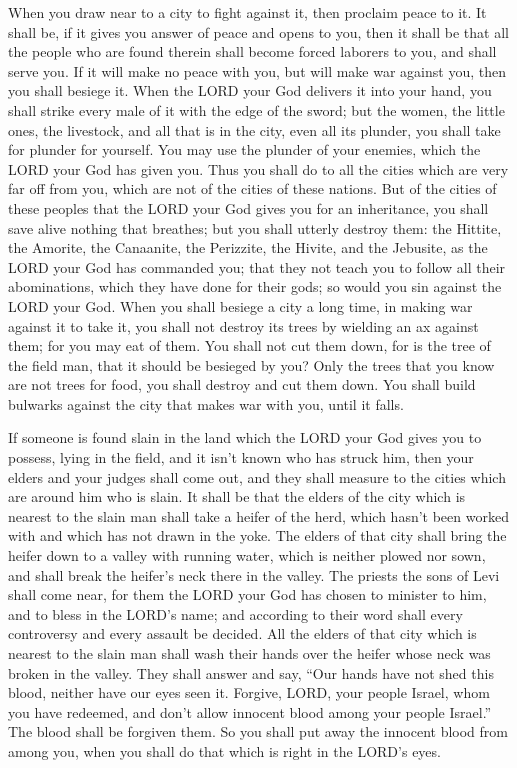 \myverse{}When you draw near to a city to fight against it, then proclaim
peace to it.
\myverse{}It shall be, if it gives you answer of peace and opens to you, then it shall
be that all the people who are found therein shall become forced laborers to you, and shall serve you.
\myverse{}If it will make no peace with you, but will make war against you, then you
shall besiege it.
\myverse{}When the LORD your God delivers it into your hand, you shall strike every
male of it with the edge of the sword;
\myverse{}but the women, the little ones, the livestock, and all that is in the city,
even all its plunder, you shall take for plunder for yourself. You may use the plunder of your enemies,
which the LORD your God has given you.
\myverse{}Thus you shall do to all the cities which are very far off from you, which
are not of the cities of these nations.
\myverse{}But of the cities of these peoples that the LORD your God gives you for an
inheritance, you shall save alive nothing that breathes;
\myverse{}but you shall utterly destroy them: the Hittite, the Amorite, the Canaanite,
the Perizzite, the Hivite, and the Jebusite, as the LORD your God has commanded you;
\myverse{}that they not teach you to follow all their abominations, which they have
done for their gods; so would you sin against the LORD your God.
\myverse{}When you shall besiege a city a long time, in making war against it to take
it, you shall not destroy its trees by wielding an ax against them; for you may eat of them. You shall
not cut them down, for is the tree of the field man, that it should be besieged by you?
\myverse{}Only the trees that you know are not trees for food, you shall destroy and
cut them down. You shall build bulwarks against the city that makes war with you, until it falls.


\mychapter{} \myverse*{}If someone is found slain in the land which the LORD your God
gives you to possess, lying in the field, and it isn’t known who has struck him,
\myverse{}then your elders and your judges shall come out, and they shall measure to
the cities which are around him who is slain.
\myverse{}It shall be that the elders of the city which is nearest to the slain man shall
take a heifer of the herd, which hasn’t been worked with and which has not drawn in the yoke.
\myverse{}The elders of that city shall bring the heifer down to a valley with running
water, which is neither plowed nor sown, and shall break the heifer’s neck there in the valley.
\myverse{}The priests the sons of Levi shall come near, for them the LORD your God has
chosen to minister to him, and to bless in the LORD’s name; and according to their word shall every controversy
and every assault be decided.
\myverse{}All the elders of that city which is nearest to the slain man shall wash their
hands over the heifer whose neck was broken in the valley.
\myverse{}They shall answer and say, “Our hands have not shed this blood, neither have
our eyes seen it.
\myverse{}Forgive, LORD, your people Israel, whom you have redeemed, and don’t allow
innocent blood among your people Israel.” The blood shall be forgiven them.
\myverse{}So you shall put away the innocent blood from among you, when you shall do
that which is right in the LORD’s eyes.


